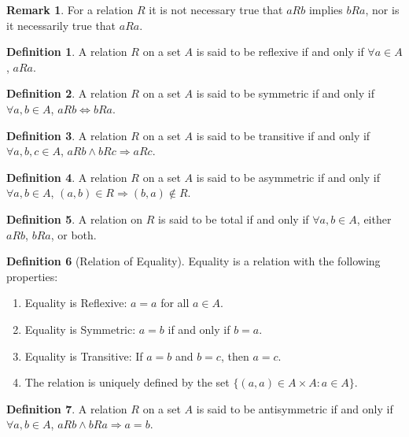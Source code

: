 \documentclass[oneside]{book}
\theoremstyle{definition}
\newtheorem{definition}{Definition}[section]
\newtheorem{remark}{Remark}[section]
\begin{document}
\begin{remark}
For a relation $R$ it is not necessary true that $aRb$ implies $bRa$, nor is it necessarily true that $aRa$.
\end{remark}

\begin{definition}
A relation $R$ on a set $A$ is said to be reflexive if and only if $\forall a\in A$, $aRa$.
\end{definition}

\begin{definition}
A relation $R$ on a set $A$ is said to be symmetric if and only if $\forall a,b\in A$, $aRb\Leftrightarrow bRa$.
\end{definition}

\begin{definition}
A relation $R$ on a set $A$ is said to be transitive if and only if $\forall a,b,c\in A$, $aRb \land bRc \Rightarrow aRc$.
\end{definition}

\begin{definition}
A relation $R$ on a set $A$ is said to be asymmetric if and only if $\forall a,b\in A$, $(a,b)\in R\Rightarrow (b,a) \notin R$.
\end{definition}

\begin{definition}
A relation on $R$ is said to be total if and only if $\forall a,b \in A$, either $aRb$, $bRa$, or both.
\end{definition}

\begin{definition}[Relation of Equality]
Equality is a relation with the following properties:
\begin{enumerate}
\item Equality is Reflexive: $a=a$ for all $a\in A$.
\item Equality is Symmetric: $a=b$ if and only if $b=a$.
\item Equality is Transitive: If $a=b$ and $b=c$, then $a=c$.
\item The relation is uniquely defined by the set $\{(a,a)\in A\times A:a\in A\}$.
\end{enumerate}
\end{definition}

\begin{definition}
A relation $R$ on a set $A$ is said to be antisymmetric if and only if $\forall a,b \in A$, $aRb\land bRa\Rightarrow a=b$.
\end{definition}
\end{document}
